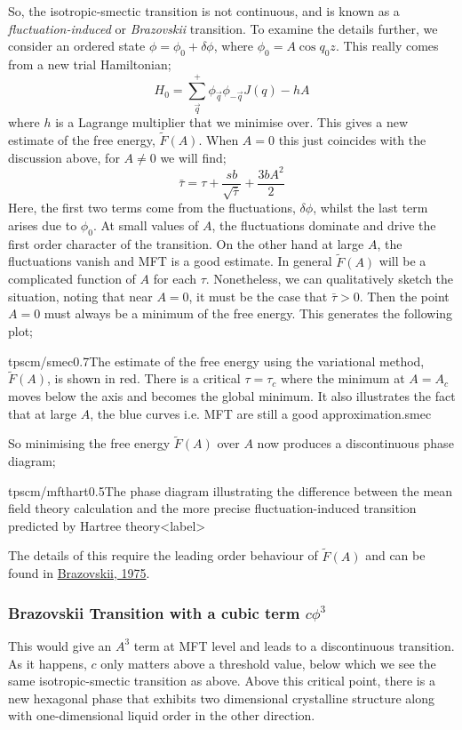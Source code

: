 \paraskip
So, the isotropic-smectic transition is not continuous, and is known as a \emph{fluctuation-induced} or \emph{Brazovskii} transition. To examine the details further, we consider an ordered state $\phi = \phi_0 + \delta \phi$, where $\phi_0 = A \cos q_0 z$. This really comes from a new trial Hamiltonian;
\begin{equation*}
H_0 = \sum_{\vec{q}}^{+}{\phi_{\vec{q}}\phi_{-\vec{q}}J(q)} - h A
\end{equation*}
where $h$ is a Lagrange multiplier that we minimise over. This gives a new estimate of the free energy, $\tilde{F}(A)$. When $A = 0$ this just coincides with the discussion above, for $A \neq 0$ we will find;
\begin{equation}
\bar{\tau} = \tau + \frac{sb}{\sqrt{\bar{\tau}}} + \frac{3bA^2}{2}
\end{equation}
Here, the first two terms come from the fluctuations, $\delta\phi$, whilst the last term arises due to $\phi_0$. At small values of $A$, the fluctuations dominate and drive the first order character of the transition. On the other hand at large $A$, the fluctuations vanish and MFT is a good estimate. In general $\tilde{F}(A)$ will be a complicated function of $A$ for each $\tau$. Nonetheless, we can qualitatively sketch the situation, noting that near $A = 0$, it must be the case that $\bar{\tau} > 0$. Then the point $A = 0$ must always be a minimum of the free energy. This generates the following plot; 
\begin{mygraphic}{tpscm/smec}{0.7}{The estimate of the free energy using the variational method, $\tilde{F}(A)$, is shown in red. There is a critical $\tau = \tau_c$ where the minimum at $A = A_c$ moves below the axis and becomes the global minimum. It also illustrates the fact that at large $A$, the blue curves i.e. MFT are still a good approximation.}{smec}\end{mygraphic}
So minimising the free energy $\tilde{F}(A)$ over $A$ now produces a discontinuous phase diagram;
\begin{mygraphic}{tpscm/mfthart}{0.5}{The phase diagram illustrating the difference between the mean field theory calculation and the more precise fluctuation-induced transition predicted by Hartree theory}{<label>}\end{mygraphic}
The details of this require the leading order behaviour of $\tilde{F}(A)$ and can be found in \href{http://www.jetp.ac.ru/cgi-bin/dn/e_041_01_0085.pdf}{Brazovskii, 1975}.
\subsubsection*{Brazovskii Transition with a cubic term $c\phi^3$}
This would give an $A^3$ term at MFT level and leads to a discontinuous transition. As it happens, $c$ only matters above a threshold value, below which we see the same isotropic-smectic transition as above. Above this critical point, there is a new hexagonal phase that exhibits two dimensional crystalline structure along with one-dimensional liquid order in the other direction.
\newpage
